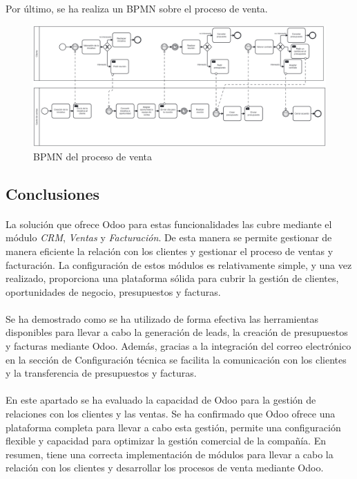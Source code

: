 Por último, se ha realiza un BPMN sobre el proceso de venta.
\begin{figure}[h]
    \centering
    \includegraphics[width=1\linewidth]{bpmn/venta.png}
    \caption{BPMN del proceso de venta}
    \label{fig:enter-label}
\end{figure}
\subsection{Conclusiones}
\paragraph{}
La solución que ofrece Odoo para estas funcionalidades las cubre mediante el módulo \textit{CRM}, \textit{Ventas} y \textit{Facturación}. De esta manera se permite gestionar de manera eficiente la relación con los clientes y gestionar el proceso de ventas y facturación. La configuración de estos módulos es relativamente simple, y una vez realizado, proporciona una plataforma sólida para cubrir la gestión de clientes, oportunidades de negocio, presupuestos y facturas.
\paragraph{}
Se ha demostrado como se ha utilizado de forma efectiva las herramientas disponibles para llevar a cabo la generación de leads, la creación de presupuestos y facturas mediante Odoo. Además, gracias a la integración del correo electrónico en la sección de Configuración técnica se facilita la comunicación con los clientes y la transferencia de presupuestos y facturas.
\paragraph{}
En este apartado se ha evaluado la capacidad de Odoo para la gestión de relaciones con los clientes y las ventas. Se ha confirmado que Odoo ofrece una plataforma completa para llevar a cabo esta gestión, permite una configuración flexible y capacidad para optimizar la gestión comercial de la compañía. En resumen, tiene una correcta implementación de módulos para llevar a cabo la relación con los clientes y desarrollar los procesos de venta mediante Odoo. 